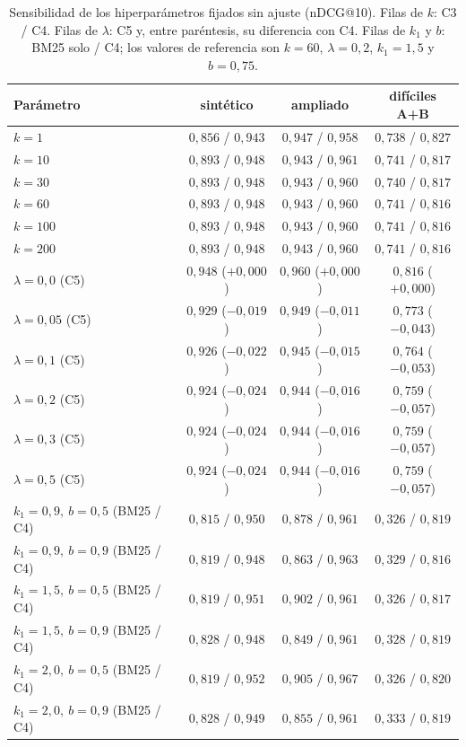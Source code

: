 \begin{table}[htbp]
\centering
\footnotesize
\setlength{\tabcolsep}{5pt}
\renewcommand{\arraystretch}{1.25}
\caption{Sensibilidad de los hiperparámetros fijados sin ajuste (nDCG@10). Filas de $k$: C3 / C4. Filas de $\lambda$: C5 y, entre paréntesis, su diferencia con C4. Filas de $k_1$ y $b$: BM25 solo / C4; los valores de referencia son $k=60$, $\lambda=0{,}2$, $k_1=1{,}5$ y $b=0{,}75$.}
\label{tab:sensibilidad}
\begin{tabularx}{\textwidth}{@{}l C C C@{}}
\toprule
\textbf{Parámetro} & \textbf{sintético} & \textbf{ampliado} & \textbf{difíciles A+B} \\
\midrule
$k=1$ & $0{,}856$ / $0{,}943$ & $0{,}947$ / $0{,}958$ & $0{,}738$ / $0{,}827$ \\
$k=10$ & $0{,}893$ / $0{,}948$ & $0{,}943$ / $0{,}961$ & $0{,}741$ / $0{,}817$ \\
$k=30$ & $0{,}893$ / $0{,}948$ & $0{,}943$ / $0{,}960$ & $0{,}740$ / $0{,}817$ \\
$k=60$ & $0{,}893$ / $0{,}948$ & $0{,}943$ / $0{,}960$ & $0{,}741$ / $0{,}816$ \\
$k=100$ & $0{,}893$ / $0{,}948$ & $0{,}943$ / $0{,}960$ & $0{,}741$ / $0{,}816$ \\
$k=200$ & $0{,}893$ / $0{,}948$ & $0{,}943$ / $0{,}960$ & $0{,}741$ / $0{,}816$ \\
$\lambda=0{,}0$ (C5) & $0{,}948$ ($+0{,}000$) & $0{,}960$ ($+0{,}000$) & $0{,}816$ ($+0{,}000$) \\
$\lambda=0{,}05$ (C5) & $0{,}929$ ($-0{,}019$) & $0{,}949$ ($-0{,}011$) & $0{,}773$ ($-0{,}043$) \\
$\lambda=0{,}1$ (C5) & $0{,}926$ ($-0{,}022$) & $0{,}945$ ($-0{,}015$) & $0{,}764$ ($-0{,}053$) \\
$\lambda=0{,}2$ (C5) & $0{,}924$ ($-0{,}024$) & $0{,}944$ ($-0{,}016$) & $0{,}759$ ($-0{,}057$) \\
$\lambda=0{,}3$ (C5) & $0{,}924$ ($-0{,}024$) & $0{,}944$ ($-0{,}016$) & $0{,}759$ ($-0{,}057$) \\
$\lambda=0{,}5$ (C5) & $0{,}924$ ($-0{,}024$) & $0{,}944$ ($-0{,}016$) & $0{,}759$ ($-0{,}057$) \\
$k_1=0{,}9,\ b=0{,}5$ (BM25 / C4) & $0{,}815$ / $0{,}950$ & $0{,}878$ / $0{,}961$ & $0{,}326$ / $0{,}819$ \\
$k_1=0{,}9,\ b=0{,}9$ (BM25 / C4) & $0{,}819$ / $0{,}948$ & $0{,}863$ / $0{,}963$ & $0{,}329$ / $0{,}816$ \\
$k_1=1{,}5,\ b=0{,}5$ (BM25 / C4) & $0{,}819$ / $0{,}951$ & $0{,}902$ / $0{,}961$ & $0{,}326$ / $0{,}817$ \\
$k_1=1{,}5,\ b=0{,}9$ (BM25 / C4) & $0{,}828$ / $0{,}948$ & $0{,}849$ / $0{,}961$ & $0{,}328$ / $0{,}819$ \\
$k_1=2{,}0,\ b=0{,}5$ (BM25 / C4) & $0{,}819$ / $0{,}952$ & $0{,}905$ / $0{,}967$ & $0{,}326$ / $0{,}820$ \\
$k_1=2{,}0,\ b=0{,}9$ (BM25 / C4) & $0{,}828$ / $0{,}949$ & $0{,}855$ / $0{,}961$ & $0{,}333$ / $0{,}819$ \\
\bottomrule
\end{tabularx}
\end{table}


